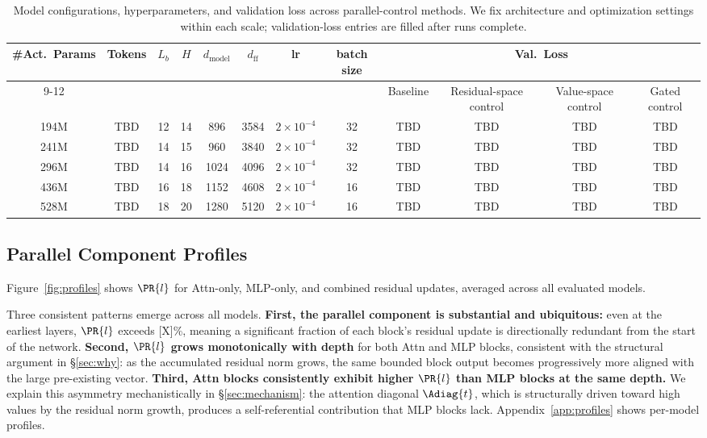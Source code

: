\begin{table}[t]
  \caption{Model configurations, hyperparameters, and validation loss across
  parallel-control methods. We fix architecture and optimization settings within each scale;
  validation-loss entries are filled after runs complete.}
  \label{tab:train-config-val-loss}
  \centering
  \small
  \begin{tabular}{cccccccc|cccc}
    \toprule
    \#Act.\ Params & Tokens & $L_b$ & $H$ & $d_{\text{model}}$ & $d_{\text{ff}}$ & lr & batch size &
    \multicolumn{4}{c}{Val.\ Loss} \\
    \cmidrule(lr){9-12}
    & & & & & & & &
    Baseline & Residual-space control & Value-space control & Gated control \\
    \midrule
    194M & TBD & 12 & 14 & 896 & 3584 & $2\times 10^{-4}$ & 32 &
    TBD & TBD & TBD & TBD \\
    241M & TBD & 14 & 15 & 960 & 3840 & $2\times 10^{-4}$ & 32 &
    TBD & TBD & TBD & TBD \\
    296M & TBD & 14 & 16 & 1024 & 4096 & $2\times 10^{-4}$ & 32 &
    TBD & TBD & TBD & TBD \\
    436M & TBD & 16 & 18 & 1152 & 4608 & $2\times 10^{-4}$ & 16 &
    TBD & TBD & TBD & TBD \\
    528M & TBD & 18 & 20 & 1280 & 5120 & $2\times 10^{-4}$ & 16 &
    TBD & TBD & TBD & TBD \\
    \bottomrule
  \end{tabular}
\end{table}

\subsection{Parallel Component Profiles}
\label{sec:profiles}

Figure~\ref{fig:profiles} shows $\PR{l}$ for Attn-only, MLP-only, and
combined residual updates, averaged across all evaluated models.

Three consistent patterns emerge across all models.
\textbf{First, the parallel component is substantial and ubiquitous:}
even at the earliest layers, $\PR{l}$ exceeds [X]\%, meaning a significant
fraction of each block's residual update is directionally redundant from the
start of the network.
\textbf{Second, $\PR{l}$ grows monotonically with depth}
for both Attn and MLP blocks, consistent with the structural argument in
\S\ref{sec:why}: as the accumulated residual norm grows, the same
bounded block output becomes progressively more aligned with the large
pre-existing vector.
\textbf{Third, Attn blocks consistently exhibit higher $\PR{l}$ than MLP
blocks at the same depth.}
We explain this asymmetry mechanistically in \S\ref{sec:mechanism}:
the attention diagonal $\Adiag{t}$, which is structurally driven toward
high values by the residual norm growth, produces a self-referential
contribution that MLP blocks lack.
Appendix~\ref{app:profiles} shows per-model profiles.

